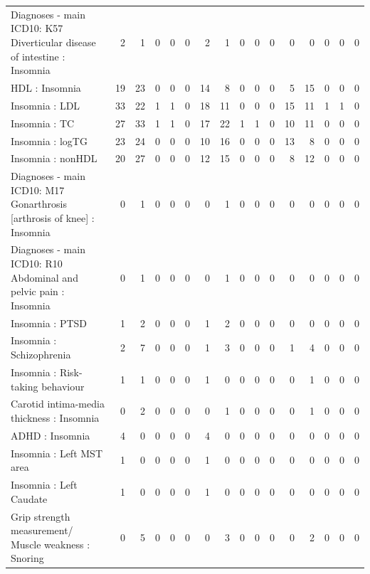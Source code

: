 \begin{table}[ht]
\begin{tabular}{lrrrrrrrrrrrrrrr}
  Diagnoses - main ICD10: K57 Diverticular disease of intestine : Insomnia &   2 &   1 &   0 &   0 &   0 &   2 &   1 &   0 &   0 &   0 &   0 &   0 &   0 &   0 &   0 \\ 
  HDL : Insomnia &  19 &  23 &   0 &   0 &   0 &  14 &   8 &   0 &   0 &   0 &   5 &  15 &   0 &   0 &   0 \\ 
  Insomnia : LDL &  33 &  22 &   1 &   1 &   0 &  18 &  11 &   0 &   0 &   0 &  15 &  11 &   1 &   1 &   0 \\ 
  Insomnia : TC &  27 &  33 &   1 &   1 &   0 &  17 &  22 &   1 &   1 &   0 &  10 &  11 &   0 &   0 &   0 \\ 
  Insomnia : logTG &  23 &  24 &   0 &   0 &   0 &  10 &  16 &   0 &   0 &   0 &  13 &   8 &   0 &   0 &   0 \\ 
  Insomnia : nonHDL &  20 &  27 &   0 &   0 &   0 &  12 &  15 &   0 &   0 &   0 &   8 &  12 &   0 &   0 &   0 \\ 
  Diagnoses - main ICD10: M17 Gonarthrosis [arthrosis of knee] : Insomnia &   0 &   1 &   0 &   0 &   0 &   0 &   1 &   0 &   0 &   0 &   0 &   0 &   0 &   0 &   0 \\ 
  Diagnoses - main ICD10: R10 Abdominal and pelvic pain : Insomnia &   0 &   1 &   0 &   0 &   0 &   0 &   1 &   0 &   0 &   0 &   0 &   0 &   0 &   0 &   0 \\ 
  Insomnia : PTSD &   1 &   2 &   0 &   0 &   0 &   1 &   2 &   0 &   0 &   0 &   0 &   0 &   0 &   0 &   0 \\ 
  Insomnia : Schizophrenia &   2 &   7 &   0 &   0 &   0 &   1 &   3 &   0 &   0 &   0 &   1 &   4 &   0 &   0 &   0 \\ 
  Insomnia : Risk-taking behaviour &   1 &   1 &   0 &   0 &   0 &   1 &   0 &   0 &   0 &   0 &   0 &   1 &   0 &   0 &   0 \\ 
  Carotid intima-media thickness : Insomnia &   0 &   2 &   0 &   0 &   0 &   0 &   1 &   0 &   0 &   0 &   0 &   1 &   0 &   0 &   0 \\ 
  ADHD : Insomnia &   4 &   0 &   0 &   0 &   0 &   4 &   0 &   0 &   0 &   0 &   0 &   0 &   0 &   0 &   0 \\ 
  Insomnia : Left MST area &   1 &   0 &   0 &   0 &   0 &   1 &   0 &   0 &   0 &   0 &   0 &   0 &   0 &   0 &   0 \\ 
  Insomnia : Left Caudate &   1 &   0 &   0 &   0 &   0 &   1 &   0 &   0 &   0 &   0 &   0 &   0 &   0 &   0 &   0 \\ 
  Grip strength measurement/ Muscle weakness : Snoring &   0 &   5 &   0 &   0 &   0 &   0 &   3 &   0 &   0 &   0 &   0 &   2 &   0 &   0 &   0 \\ 

\end{tabular}
\end{table}
